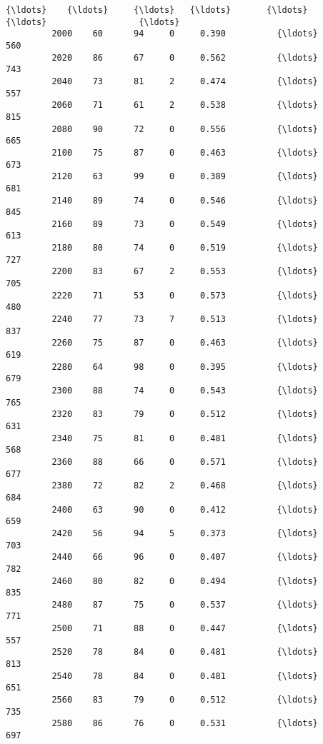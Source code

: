 \documentclass[11pt]{article}
\begin{document}
\begin{Verbatim}[commandchars=\\\{\}]
         {\ldots}    {\ldots}     {\ldots}   {\ldots}       {\ldots}          {\ldots}                  {\ldots}   
         2000    60      94     0     0.390          {\ldots}                  560   
         2020    86      67     0     0.562          {\ldots}                  743   
         2040    73      81     2     0.474          {\ldots}                  557   
         2060    71      61     2     0.538          {\ldots}                  815   
         2080    90      72     0     0.556          {\ldots}                  665   
         2100    75      87     0     0.463          {\ldots}                  673   
         2120    63      99     0     0.389          {\ldots}                  681   
         2140    89      74     0     0.546          {\ldots}                  845   
         2160    89      73     0     0.549          {\ldots}                  613   
         2180    80      74     0     0.519          {\ldots}                  727   
         2200    83      67     2     0.553          {\ldots}                  705   
         2220    71      53     0     0.573          {\ldots}                  480   
         2240    77      73     7     0.513          {\ldots}                  837   
         2260    75      87     0     0.463          {\ldots}                  619   
         2280    64      98     0     0.395          {\ldots}                  679   
         2300    88      74     0     0.543          {\ldots}                  765   
         2320    83      79     0     0.512          {\ldots}                  631   
         2340    75      81     0     0.481          {\ldots}                  568   
         2360    88      66     0     0.571          {\ldots}                  677   
         2380    72      82     2     0.468          {\ldots}                  684   
         2400    63      90     0     0.412          {\ldots}                  659   
         2420    56      94     5     0.373          {\ldots}                  703   
         2440    66      96     0     0.407          {\ldots}                  782   
         2460    80      82     0     0.494          {\ldots}                  835   
         2480    87      75     0     0.537          {\ldots}                  771   
         2500    71      88     0     0.447          {\ldots}                  557   
         2520    78      84     0     0.481          {\ldots}                  813   
         2540    78      84     0     0.481          {\ldots}                  651   
         2560    83      79     0     0.512          {\ldots}                  735   
         2580    86      76     0     0.531          {\ldots}                  697   
         

\end{Verbatim}
\end{document}
